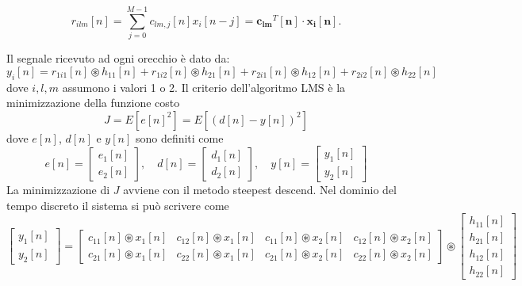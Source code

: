 \documentclass[12pt,a4paper,titlepage]{article}
\begin{document}
\begin{equation}\label{eq:r_ilm_prodotto_scalare}
r_{ilm}[n]=\sum_{j=0}^{M-1}c_{lm,j}[n]x_i[n-j] = \mathbf{c_{lm}}^T[\mathbf{n}] \cdot \mathbf{x_i}[\mathbf{n}].
\end{equation}

Il segnale ricevuto ad ogni orecchio è dato da:
\begin{equation}\label{eq:y_i_lms}
y_i[n]=r_{1i1}[n] \circledast h_{11}[n]+r_{1i2}[n] \circledast h_{21}[n]+
r_{2i1}[n] \circledast h_{12}[n]+r_{2i2}[n] \circledast h_{22}[n]
\end{equation}
dove $i,l,m$ assumono i valori 1 o 2.
Il criterio dell'algoritmo LMS è la minimizzazione della funzione costo
\begin{equation}\label{eq:errore_lms}
J=E[e[n]^2]=E[(d[n]-y[n])^2]
\end{equation}
dove $e[n]$, $d[n]$ e $y[n]$ sono definiti come
\begin{equation}
e[n]=
\begin{bmatrix}
e_1[n]\\
e_2[n]
\end{bmatrix},\quad
d[n]=
\begin{bmatrix}
d_1[n]\\
d_2[n]
\end{bmatrix},\quad
y[n]=
\begin{bmatrix}
y_1[n]\\
y_2[n]
\end{bmatrix}
\end{equation}
La minimizzazione di $J$ avviene con il metodo steepest descend.
Nel dominio del tempo discreto il sistema si può scrivere come
\begin{equation}\label{eq:y_lms}
\begin{bmatrix}
	y_1[n]     \\
	y_2[n]    
\end{bmatrix}
= 
\begin{bmatrix}
	c_{11}[n] \circledast x_1[n]  &  c_{12}[n] \circledast x_1[n]  & c_{11}[n] \circledast x_2[n]  & c_{12}[n] \circledast x_2[n]    \\
	c_{21}[n] \circledast x_1[n]  &  c_{22}[n] \circledast x_1[n]  & c_{21}[n] \circledast x_2[n]  & c_{22}[n] \circledast x_2[n]     
\end{bmatrix} 
\circledast
\begin{bmatrix}
	h_{11}[n] \\
	h_{21}[n] \\
	h_{12}[n] \\
	h_{22}[n]  
\end{bmatrix}
\end{equation}
\end{document}
